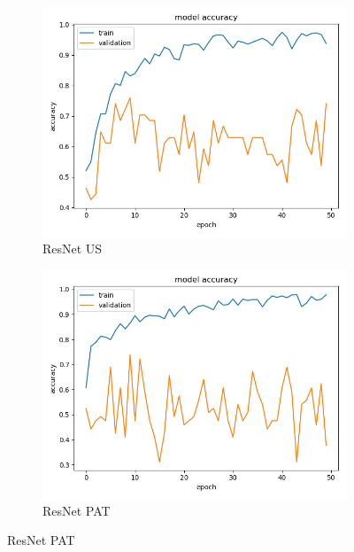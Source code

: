 \begin{figure}
\begin{subfigure}[b]{.45\linewidth}
\includegraphics[width=\linewidth]{Figs/resnet_us_acc.jpg}
\caption{ResNet US}
\end{subfigure}
\begin{subfigure}[b]{.45\linewidth}
\includegraphics[width=\linewidth]{Figs/resnet_pat_acc.jpg}
\caption{ResNet PAT}
\end{subfigure}


\end{figure}
